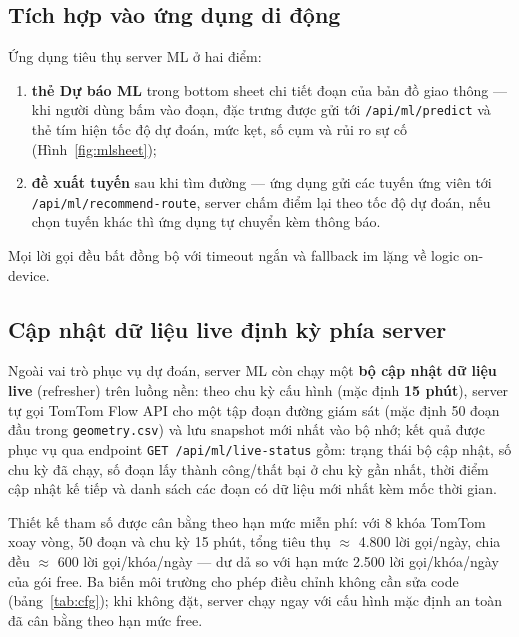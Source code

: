 \subsection{Tích hợp vào ứng dụng di động}
Ứng dụng tiêu thụ server ML ở hai điểm:
\begin{enumerate}[label=(\roman*),leftmargin=2.2cm,itemsep=2pt]
 \item \textbf{thẻ Dự báo ML} trong bottom sheet chi tiết đoạn của bản đồ giao thông --- khi người dùng bấm vào đoạn, đặc trưng được gửi tới \texttt{/api/ml/predict} và thẻ tím hiện tốc độ dự đoán, mức kẹt, số cụm và rủi ro sự cố (Hình~\ref{fig:mlsheet});
 \item \textbf{đề xuất tuyến} sau khi tìm đường --- ứng dụng gửi các tuyến ứng viên tới \texttt{/api/ml/recommend-route}, server chấm điểm lại theo tốc độ dự đoán, nếu chọn tuyến khác thì ứng dụng tự chuyển kèm thông báo.
\end{enumerate}
Mọi lời gọi đều bất đồng bộ với timeout ngắn và fallback im lặng về logic on-device.

\subsection{Cập nhật dữ liệu live định kỳ phía server}
Ngoài vai trò phục vụ dự đoán, server ML còn chạy một \textbf{bộ cập nhật dữ liệu live} (refresher) trên luồng nền: theo chu kỳ cấu hình (mặc định \textbf{15 phút}), server tự gọi TomTom Flow API cho một tập đoạn đường giám sát (mặc định 50 đoạn đầu trong \texttt{geometry.csv}) và lưu snapshot mới nhất vào bộ nhớ; kết quả được phục vụ qua endpoint \texttt{GET /api/ml/live-status} gồm: trạng thái bộ cập nhật, số chu kỳ đã chạy, số đoạn lấy thành công/thất bại ở chu kỳ gần nhất, thời điểm cập nhật kế tiếp và danh sách các đoạn có dữ liệu mới nhất kèm mốc thời gian.

Thiết kế tham số được cân bằng theo hạn mức miễn phí: với 8 khóa TomTom xoay vòng, 50 đoạn và chu kỳ 15 phút, tổng tiêu thụ $\approx$ 4.800 lời gọi/ngày, chia đều $\approx$ 600 lời gọi/khóa/ngày --- dư dả so với hạn mức 2.500 lời gọi/khóa/ngày của gói free. Ba biến môi trường cho phép điều chỉnh không cần sửa code (bảng~\ref{tab:cfg}); khi không đặt, server chạy ngay với cấu hình mặc định an toàn đã cân bằng theo hạn mức free.

